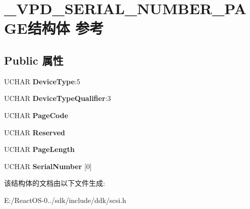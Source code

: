 \hypertarget{struct___v_p_d___s_e_r_i_a_l___n_u_m_b_e_r___p_a_g_e}{}\section{\+\_\+\+V\+P\+D\+\_\+\+S\+E\+R\+I\+A\+L\+\_\+\+N\+U\+M\+B\+E\+R\+\_\+\+P\+A\+G\+E结构体 参考}
\label{struct___v_p_d___s_e_r_i_a_l___n_u_m_b_e_r___p_a_g_e}
\subsection*{Public 属性}
\begin{DoxyCompactItemize}
\item 
\mbox{\label{struct___v_p_d___s_e_r_i_a_l___n_u_m_b_e_r___p_a_g_e_aea2bb95c1a9b57f74d1cb1b7473bd650}} 
U\+C\+H\+AR {\bfseries Device\+Type}\+:5
\item 
\mbox{\label{struct___v_p_d___s_e_r_i_a_l___n_u_m_b_e_r___p_a_g_e_a189f54830a5ca0bb93c4b6db100e3eff}} 
U\+C\+H\+AR {\bfseries Device\+Type\+Qualifier}\+:3
\item 
\mbox{\label{struct___v_p_d___s_e_r_i_a_l___n_u_m_b_e_r___p_a_g_e_ad00230b1175fad878b54a5e173fee832}} 
U\+C\+H\+AR {\bfseries Page\+Code}
\item 
\mbox{\label{struct___v_p_d___s_e_r_i_a_l___n_u_m_b_e_r___p_a_g_e_aa67a6e5f74a0cc76ce9cdcf4f1c4e169}} 
U\+C\+H\+AR {\bfseries Reserved}
\item 
\mbox{\label{struct___v_p_d___s_e_r_i_a_l___n_u_m_b_e_r___p_a_g_e_a1b8a7a9cb3905f4a42a2ef9a88018276}} 
U\+C\+H\+AR {\bfseries Page\+Length}
\item 
\mbox{\label{struct___v_p_d___s_e_r_i_a_l___n_u_m_b_e_r___p_a_g_e_aeab761d482d9a7d7b23ae2d6a946cd7b}} 
U\+C\+H\+AR {\bfseries Serial\+Number} \mbox{[}0\mbox{]}
\end{DoxyCompactItemize}


该结构体的文档由以下文件生成\+:\begin{DoxyCompactItemize}
\item 
E\+:/\+React\+O\+S-\/0../sdk/include/ddk/scsi.\+h\end{DoxyCompactItemize}
